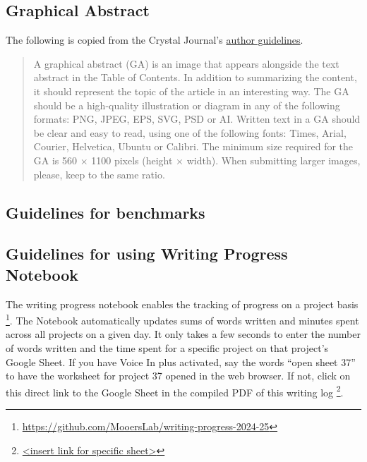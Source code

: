 \documentclass[10pt,letterpaper]{article}
\begin{document}
\subsection{Graphical Abstract}
\label{subsec:guides:graphicalAbstract}


The following is copied from the Crystal Journal's \href{https://www.mdpi.com/journal/crystals/instructions#preparation}{author guidelines}.

\begin{quote}
A graphical abstract (GA) is an image that appears alongside the text abstract in the Table of Contents. 
In addition to summarizing the content, it should represent the topic of the article in an interesting way.
The GA should be a high-quality illustration or diagram in any of the following formats: PNG, JPEG, EPS, SVG, PSD or AI. 
Written text in a GA should be clear and easy to read, using one of the following fonts: Times, Arial, Courier, Helvetica, Ubuntu or Calibri.
The minimum size required for the GA is 560 $\times$ 1100 pixels (height $\times$ width). 
When submitting larger images, please, keep to the same ratio.
\end{quote}



\subsection{Guidelines for benchmarks}
\label{subsec:guides:benchmarks}


\subsection{Guidelines for using Writing Progress Notebook}
\label{subsec:guides:wpnb}

The writing progress notebook enables the tracking of progress on a project basis \footnote{\url{https://github.com/MooersLab/writing-progress-2024-25}}.
The Notebook automatically updates sums of words written and minutes spent across all projects on a given day.
It only takes a few seconds to enter the number of words written and the time spent for a specific project on that project's Google Sheet. 
If you have Voice In plus activated, say the words ``open sheet 37'' to have the worksheet for project 37 opened in the web browser.
If not, click on this direct link to the Google Sheet in the compiled PDF of this writing log \footnote{\url{<insert link for specific sheet>}}.
\end{document}
